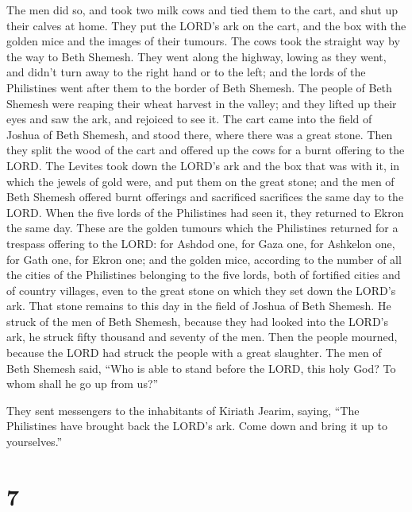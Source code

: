  The men did so, and took two milk cows and tied them to
the cart, and shut up their calves at home.  They put the
LORD's ark on the cart, and the box with the golden mice and the images
of their tumours.  The cows took the straight way by the
way to Beth Shemesh. They went along the highway, lowing as they went,
and didn't turn away to the right hand or to the left; and the lords of
the Philistines went after them to the border of Beth Shemesh.
 The people of Beth Shemesh were reaping their wheat
harvest in the valley; and they lifted up their eyes and saw the ark,
and rejoiced to see it.  The cart came into the field of
Joshua of Beth Shemesh, and stood there, where there was a great stone.
Then they split the wood of the cart and offered up the cows for a burnt
offering to the LORD.  The Levites took down the LORD's ark
and the box that was with it, in which the jewels of gold were, and put
them on the great stone; and the men of Beth Shemesh offered burnt
offerings and sacrificed sacrifices the same day to the LORD.
 When the five lords of the Philistines had seen it, they
returned to Ekron the same day.  These are the golden
tumours which the Philistines returned for a trespass offering to the
LORD: for Ashdod one, for Gaza one, for Ashkelon one, for Gath one, for
Ekron one;  and the golden mice, according to the number of
all the cities of the Philistines belonging to the five lords, both of
fortified cities and of country villages, even to the great stone on
which they set down the LORD's ark. That stone remains to this day in
the field of Joshua of Beth Shemesh.  He struck of the men
of Beth Shemesh, because they had looked into the LORD's ark, he struck
fifty thousand and seventy of the men. Then the people mourned, because
the LORD had struck the people with a great slaughter.  The
men of Beth Shemesh said, ``Who is able to stand before the LORD, this
holy God? To whom shall he go up from us?''

 They sent messengers to the inhabitants of Kiriath Jearim,
saying, ``The Philistines have brought back the LORD's ark. Come down
and bring it up to yourselves.''

\hypertarget{section-6}{%
\section{7}\label{section-6}}

